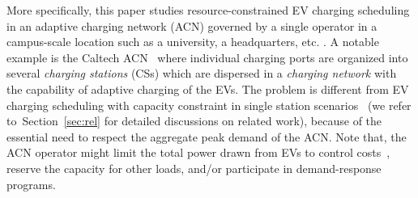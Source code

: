 \documentclass[journal]{IEEEtran}
\newcommand{\rev}[1]{{\color{black}#1}}%
\newcommand{\revv}[1]{{\color{black}#1}}%
\newcommand{\rev}[1]{#1}
\begin{document}


More specifically, this paper studies resource-constrained EV charging scheduling in an adaptive charging network (ACN) governed by a single operator in a campus-scale location such as a university, a headquarter\rev{s}, etc. \cite{wu2017two}. 
\rev{A notable example is the Caltech ACN~\cite{lee2016adaptive} where individual charging ports are organized into several \textit{charging stations} (CSs) which are dispersed in a \textit{charging network}} with the capability of adaptive charging of the EVs. 
The problem is different from EV charging scheduling \revv{with capacity constraint} in single station scenarios~\cite{Tang,Wen,Shroff2014,WTang,Chen,Xiang,Zhao,Robu} (we refer to~Section~\ref{sec:rel} for detailed discussions on related work), because of the essential need to respect the aggregate peak demand of the ACN. \revv{Note that, the ACN operator might limit the total power drawn from EVs to control costs~\cite{PeakPrice,Zhang2015eEnergy}, reserve the capacity for other loads, and/or participate in demand-response programs.}


\end{document}
